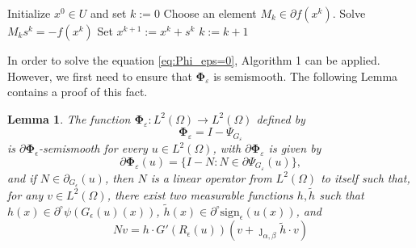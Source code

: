 \documentclass[11pt,a4paper]{amsart}
\newcommand{\om}{\Omega}
\newcommand{\sign}{\mathrm{sign}}
\newtheorem{lemma}{{Lemma}}
\begin{document}
\begin{algorithm}
\caption{Semismooth Newton Algorithm}\label{alg:SSN}
\begin{algorithmic}[1]
\State Initialize $x^0 \in U$ and set $k := 0$
    \State Choose an element $M_k\in \partial f(x^k)$.
    \State Solve $M_ks^k = -f(x^k)$ 
    \State Set $x^{k+1} := x^k + s^k$
    \State $k := k + 1$
\EndWhile
\end{algorithmic}
\end{algorithm}
 In order to solve the equation \eqref{eq:Phi_eps=0}, Algorithm 1 can be applied. However, we first need to ensure that $\mathbf{\Phi}_\varepsilon$ is semismooth. The following Lemma contains a proof of this fact.

\begin{lemma}\label{lemma2} 
The function $\mathbf{\Phi}_\varepsilon: L^2(\om) \to L^2(\om)$ defined by
$$ \mathbf{\Phi}_\varepsilon = I - \Psi_{G_\varepsilon}$$
is $\partial \mathbf{\Phi}_{\epsilon}$-semismooth for every $u\in L^2(\om)$, with $\partial \mathbf{\Phi}_\varepsilon$ is given by
\begin{equation}
\partial \mathbf{\Phi}_\varepsilon (u) =\{I-N: N\in \partial \Psi_{G_\varepsilon}(u) \},
\end{equation}
and if $N\in \partial_{G_{\epsilon}}(u)$, then $N$ is a linear operator from $L^2(\om)$ to itself such that, for any $v\in L^2(\om)$, there exist two measurable functions $h, \tilde{h}$ such that $h(x)\in \partial^{\circ}\psi(G_{\epsilon}(u)(x))$, $\tilde{h}(x)\in \partial^{\circ}\sign_{\epsilon}(u(x))$, and
\begin{equation}\label{eq:newton_derivate}
Nv=h\cdot G'(R_{\epsilon}(u))(v+\jmath_{\alpha,\beta}\tilde{h}\cdot v)
\end{equation}

\end{lemma}
\end{document}
